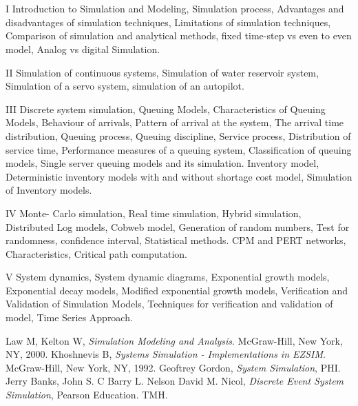 \section{\courseinfo}


\unit{I}
Introduction to Simulation and Modeling, Simulation process, Advantages and disadvantages of simulation techniques, Limitations of simulation techniques, Comparison of simulation and analytical methods, fixed time-step vs even to even model, Analog vs digital Simulation. 

\unit{II}
Simulation of continuous systems, Simulation of water reservoir
system, Simulation of a servo system, simulation of an autopilot.


\unit{III}
Discrete system simulation, Queuing Models, Characteristics of
Queuing Models, Behaviour of arrivals, Pattern of arrival at the
system, The arrival time distribution, Queuing process, Queuing
discipline, Service process, Distribution of service time, Performance
measures of a queuing system, Classification of queuing
models, Single server queuing models and its simulation. Inventory model, Deterministic inventory models with and without
shortage cost model, Simulation of Inventory models.
 

\unit{IV}
Monte- Carlo simulation, Real time simulation, Hybrid simulation,
Distributed Log models, Cobweb model, Generation of random
numbers, Test for randomness, confidence interval, Statistical
methods. CPM and PERT networks, Characteristics, Critical path computation.


\unit{V}
System dynamics, System dynamic diagrams, Exponential growth models, Exponential decay models, Modified exponential growth models, Verification and Validation of Simulation Models, Techniques for verification and validation of model, Time Series Approach.


\begin{thebibliography}{99}
             Law M, Kelton W, \emph{Simulation Modeling and Analysis}. McGraw-Hill, New York, NY, 2000.
             Khoshnevis B, \emph{Systems Simulation - Implementations in EZSIM}. McGraw-Hill, New York, NY, 1992.
             Geoftrey Gordon, \emph{ System Simulation}, PHI.
             Jerry Banks, John S. C Barry L. Nelson David M. Nicol, \emph{Discrete Event System
        Simulation}, Pearson Education.
        TMH.
\end{thebibliography}
